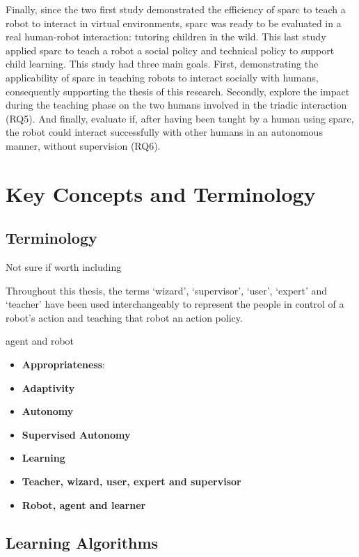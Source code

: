 Finally, since the two first study demonstrated the efficiency of \gls{sparc} to teach a robot to interact in virtual environments, \gls{sparc} was ready to be evaluated in a real human-robot interaction: tutoring children in the wild. This last study applied \gls{sparc} to teach a robot a social policy and technical policy to support child learning. This study had three main goals. First, demonstrating the applicability of \gls{sparc} in teaching robots to interact socially with humans, consequently supporting the thesis of this research. Secondly, explore the impact during the teaching phase on the two humans involved in the triadic interaction (RQ5). And finally, evaluate if, after having been taught by a human using \gls{sparc}, the robot could interact successfully with other humans in an autonomous manner, without supervision (RQ6).

\section{Key Concepts and Terminology}\label{sec:intro-concepts}

\subsection{Terminology}

Not sure if worth including

Throughout this thesis, the terms `wizard', `supervisor', `user', `expert' and `teacher' have been used interchangeably to represent the people in control of a robot's action and teaching that robot an action policy.

agent and robot

\begin{itemize}
	\item \textbf{Appropriateness}:
	\item \textbf{Adaptivity}
	\item \textbf{Autonomy}
	\item \textbf{Supervised Autonomy}
	\item \textbf{Learning}
	\item \textbf{Teacher, wizard, user, expert and supervisor}
	\item \textbf{Robot, agent and learner}
\end{itemize}

\subsection{Learning Algorithms}

